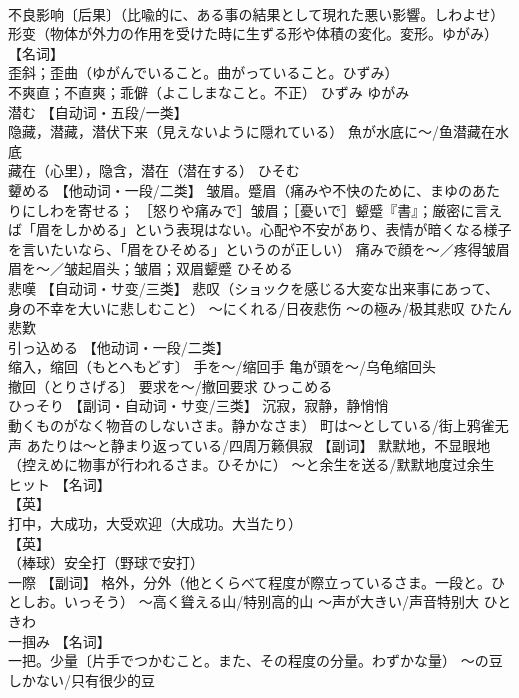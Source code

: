 \documentclass[8pt]{extreport}
\begin{document}
\begin{CJK}{UTF8}{min}
\\	不良影响〔后果〕（比喩的に、ある事の結果として現れた悪い影響。しわよせ） 
\\	形变（物体が外力の作用を受けた時に生ずる形や体積の変化。変形。ゆがみ） 【名词】 
\\	歪斜；歪曲（ゆがんでいること。曲がっていること。ひずみ） 
\\	不爽直；不直爽；乖僻（よこしまなこと。不正）	ひずみ ゆがみ	
\\	潜む	【自动词・五段/一类】 
\\	隐藏，潜藏，潜伏下来（見えないように隠れている） 魚が水底に～/鱼潜藏在水底 
\\	藏在（心里），隐含，潜在（潜在する）	ひそむ	
\\	顰める	【他动词・一段/二类】 皱眉。蹙眉（痛みや不快のために、まゆのあたりにしわを寄せる； ［怒りや痛みで］皱眉；［憂いで］颦蹙『書』；厳密に言えば「眉をしかめる」という表現はない。心配や不安があり、表情が暗くなる様子を言いたいなら、「眉をひそめる」というのが正しい） 痛みで顔を～／疼得皱眉 眉を～／皱起眉头；皱眉；双眉颦蹙	ひそめる	
\\	悲嘆	【自动词・サ变/三类】 悲叹（ショックを感じる大変な出来事にあって、身の不幸を大いに悲しむこと） ～にくれる/日夜悲伤 ～の極み/极其悲叹	ひたん	悲歎
\\	引っ込める	【他动词・一段/二类】 
\\	缩入，缩回（もとへもどす〕 手を～/缩回手 亀が頭を～/乌龟缩回头 
\\	撤回（とりさげる〕 要求を～/撤回要求	ひっこめる	
\\	ひっそり	【副词・自动词・サ变/三类】 沉寂，寂静，静悄悄
\\	動くものがなく物音のしないさま。静かなさま） 町は～としている/街上鸦雀无声 あたりは～と静まり返っている/四周万籁俱寂 【副词】 默默地，不显眼地（控えめに物事が行われるさま。ひそかに） ～と余生を送る/默默地度过余生		
\\	ヒット	【名词】 
\\	【英】
\\	打中，大成功，大受欢迎（大成功。大当たり） 
\\	【英】
\\	（棒球）安全打（野球で安打）		
\\	一際	【副词】 格外，分外（他とくらべて程度が際立っているさま。一段と。ひとしお。いっそう） ～高く聳える山/特别高的山 ～声が大きい/声音特别大	ひときわ	
\\	一掴み	【名词】 
\\	一把。少量〔片手でつかむこと。また、その程度の分量。わずかな量） ～の豆しかない/只有很少的豆 

\end{CJK}
\end{document}
